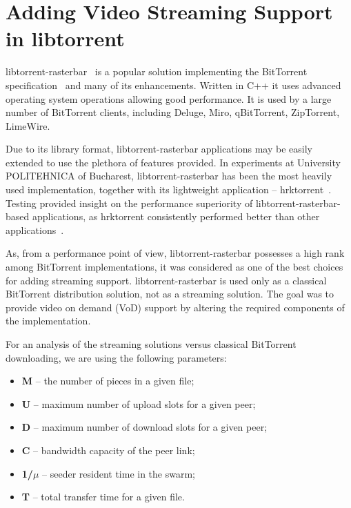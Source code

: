 \section{Adding Video Streaming Support in libtorrent}
\label{sec:multimedia-dist:libtorrent}

libtorrent-rasterbar~\cite{libtorrent} is a popular solution implementing the
BitTorrent specification~\cite{bittorrent} and many of its enhancements.
Written in C++ it uses advanced operating system operations allowing good
performance. It is used by a large number of BitTorrent clients, including
Deluge, Miro, qBitTorrent, ZipTorrent, LimeWire.

Due to its library format, libtorrent-rasterbar applications may be easily
extended to use the plethora of features provided. In experiments at
University POLITEHNICA of Bucharest, libtorrent-rasterbar has been the most
heavily used implementation, together with its lightweight application --
hrktorrent~\cite{hrktorrent}. Testing provided insight on the performance
superiority of libtorrent-rasterbar-based applications, as hrktorrent
consistently performed better than other applications~\cite{Deaconescu2009}.

As, from a performance point of view, libtorrent-rasterbar possesses a high
rank among BitTorrent implementations, it was considered as one of the best
choices for adding streaming support. libtorrent-rasterbar is used only
as a classical BitTorrent distribution solution, not as a streaming solution.
The goal was to provide video on demand (VoD) support by altering the required
components of the implementation.

For an analysis of the streaming solutions versus classical BitTorrent
downloading, we are using the following parameters:

\begin{itemize}
  \item \textbf{M} -- the number of pieces in a given file;
  \item \textbf{U} -- maximum number of upload slots for a given peer;
  \item \textbf{D} -- maximum number of download slots for a given peer;
  \item \textbf{C} -- bandwidth capacity of the peer link;
  \item \textbf{1/$\mu$} -- seeder resident time in the swarm;
  \item \textbf{T} -- total transfer time for a given file.
\end{itemize}

